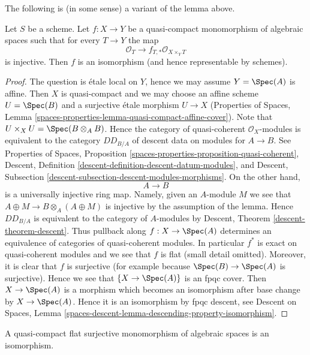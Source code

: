 \noindent
The following is (in some sense) a variant of the lemma above.

\begin{lemma}
\label{lemma-ui-case}
Let $S$ be a scheme. Let $f : X \to Y$ be a quasi-compact monomorphism
of algebraic spaces such that for every $T \to Y$ the map
$$
\mathcal{O}_T \to f_{T,*}\mathcal{O}_{X \times_Y T}
$$
is injective. Then $f$ is an isomorphism (and hence representable by schemes).
\end{lemma}

\begin{proof}
The question is \'etale local on $Y$, hence we may assume $Y = \Spec(A)$
is affine. Then $X$ is quasi-compact and we may choose an affine scheme
$U = \Spec(B)$ and a surjective \'etale morphism $U \to X$
(Properties of Spaces, Lemma
\ref{spaces-properties-lemma-quasi-compact-affine-cover}).
Note that $U \times_X U = \Spec(B \otimes_A B)$. Hence the category of
quasi-coherent $\mathcal{O}_X$-modules is equivalent to the
category $DD_{B/A}$ of descent data on modules for $A \to B$.
See Properties of Spaces, Proposition
\ref{spaces-properties-proposition-quasi-coherent},
Descent, Definition \ref{descent-definition-descent-datum-modules}, and
Descent, Subsection \ref{descent-subsection-descent-modules-morphisms}.
On the other hand,
$$
A \to B
$$
is a universally injective ring map. Namely, given an
$A$-module $M$ we see that $A \oplus M \to B \otimes_A (A \oplus M)$
is injective by the assumption of the lemma. Hence
$DD_{B/A}$ is equivalent to the category of $A$-modules by
Descent, Theorem \ref{descent-theorem-descent}. Thus pullback along
$f : X \to \Spec(A)$ determines an equivalence of categories of
quasi-coherent modules. In particular $f^*$ is exact on
quasi-coherent modules and we see that $f$ is flat
(small detail omitted). Moreover, it is clear that $f$ is surjective
(for example because $\Spec(B) \to \Spec(A)$ is surjective).
Hence we see that $\{X \to \Spec(A)\}$ is an fpqc cover.
Then $X \to \Spec(A)$ is a morphism which becomes an isomorphism
after base change by $X \to \Spec(A)$. Hence it is an isomorphism by
fpqc descent, see Descent on Spaces, Lemma
\ref{spaces-descent-lemma-descending-property-isomorphism}.
\end{proof}

\begin{lemma}
\label{lemma-flat-surjective-monomorphism}
A quasi-compact flat surjective monomorphism of algebraic spaces
is an isomorphism.
\end{lemma}

